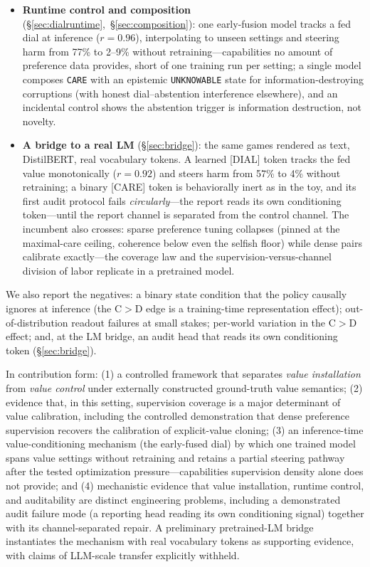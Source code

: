 \documentclass[manuscript, screen, review]{jair}
\newcommand{\care}{\texttt{CARE}}
\newcommand{\unknown}{\texttt{UNKNOWABLE}}
\begin{document}
\begin{itemize}
\item \textbf{Runtime control and composition} (\S\ref{sec:dialruntime},~\S\ref{sec:composition}): one early-fusion model tracks a fed dial at inference ($r{=}0.96$), interpolating to unseen settings and steering harm from 77\% to 2--9\% without retraining---capabilities no amount of preference data provides, short of one training run per setting; a single model composes \care{} with an epistemic \unknown{} state for information-destroying corruptions (with honest dial--abstention interference elsewhere), and an incidental control shows the abstention trigger is information destruction, not novelty.
\item \textbf{A bridge to a real LM} (\S\ref{sec:bridge}): the same games rendered as text, DistilBERT, real vocabulary tokens. A learned [DIAL] token tracks the fed value monotonically ($r{=}0.92$) and steers harm from 57\% to 4\% without retraining; a binary [CARE] token is behaviorally inert as in the toy, and its first audit protocol fails \emph{circularly}---the report reads its own conditioning token---until the report channel is separated from the control channel. The incumbent also crosses: sparse preference tuning collapses (pinned at the maximal-care ceiling, coherence below even the selfish floor) while dense pairs calibrate exactly---the coverage law and the supervision-versus-channel division of labor replicate in a pretrained model.
\end{itemize}

We also report the negatives: a binary state condition that the policy causally ignores at inference (the C$>$D edge is a training-time representation effect); out-of-distribution readout failures at small stakes; per-world variation in the C$>$D effect; and, at the LM bridge, an audit head that reads its own conditioning token (\S\ref{sec:bridge}).

In contribution form: (1) a controlled framework that separates \emph{value installation} from \emph{value control} under externally constructed ground-truth value semantics; (2) evidence that, in this setting, supervision coverage is a major determinant of value calibration, including the controlled demonstration that dense preference supervision recovers the calibration of explicit-value cloning; (3) an inference-time value-conditioning mechanism (the early-fused dial) by which one trained model spans value settings without retraining and retains a partial steering pathway after the tested optimization pressure---capabilities supervision density alone does not provide; and (4) mechanistic evidence that value installation, runtime control, and auditability are distinct engineering problems, including a demonstrated audit failure mode (a reporting head reading its own conditioning signal) together with its channel-separated repair. A preliminary pretrained-LM bridge instantiates the mechanism with real vocabulary tokens as supporting evidence, with claims of LLM-scale transfer explicitly withheld.
\end{document}
